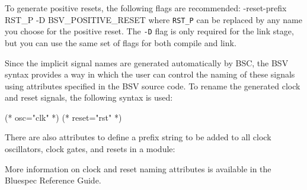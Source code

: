\documentclass{article}
\newcommand{\te}[1]{\texttt{#1}}
\newenvironment{centerboxverbatim}
  {\center
   \boxedverbatim}
  {\endboxedverbatim
  {\endcenter }}
\begin{document}
To generate  positive resets, the following flags are recommended:
\begin{centerboxverbatim}
-reset-prefix RST_P -D BSV_POSITIVE_RESET
\end{centerboxverbatim}
where \te{RST\_P} can be replaced by any name you choose for the
positive reset.  The \te{-D} flag is only required for the link stage,
but you can use the same set of flags for both compile and link.


Since the implicit signal names are generated automatically by BSC,
the BSV syntax provides a way in which the user can control
the naming of these signals using attributes specified in the BSV
source code.   To rename the generated clock and reset
signals, the following syntax is used:

\begin{centerboxverbatim}
(* osc="clk" *)
(* reset="rst" *)
\end{centerboxverbatim}

There are also attributes to define  a prefix string to be added to all clock
oscillators, clock gates, and resets in a module:



More information on clock and reset naming attributes is available in
the  Bluespec Reference Guide.




\end{document}
